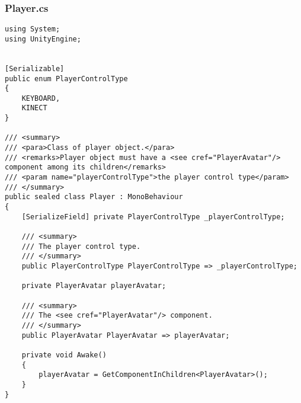 \subsubsection*{Player.cs}
\begin{verbatim}
using System;
using UnityEngine;


[Serializable]
public enum PlayerControlType
{
    KEYBOARD,
    KINECT
}

/// <summary>
/// <para>Class of player object.</para>
/// <remarks>Player object must have a <see cref="PlayerAvatar"/> component among its children</remarks>
/// <param name="playerControlType">the player control type</param>
/// </summary>
public sealed class Player : MonoBehaviour
{
    [SerializeField] private PlayerControlType _playerControlType;

    /// <summary>
    /// The player control type.
    /// </summary>
    public PlayerControlType PlayerControlType => _playerControlType;

    private PlayerAvatar playerAvatar;

    /// <summary>
    /// The <see cref="PlayerAvatar"/> component.
    /// </summary>
    public PlayerAvatar PlayerAvatar => playerAvatar;

    private void Awake()
    {
        playerAvatar = GetComponentInChildren<PlayerAvatar>();
    }
}
\end{verbatim}
